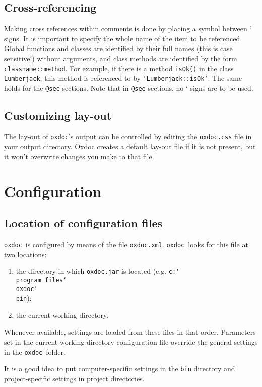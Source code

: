 \documentclass{article}
\newcommand\oxdoc{{\tt oxdoc}}
\newcommand\oxdocxml{{\tt oxdoc.xml}}
\newcommand\bs{{\tt\char`\\}}
\begin{document}
\subsection{Cross-referencing}
Making cross references within comments is done by placing a symbol between ` signs.  It is important to
specify the whole name of the item to be referenced.  Global functions and classes are identified by
their full names (this is case sensitive!) without arguments, and class methods are identified by the
form {\tt classname::method}. For example, if there is a method {\tt isOk()} in the class {\tt Lumberjack},
this method is referenced to by {\tt `Lumberjack::isOk`}.  The same holds for the {\tt @see} sections.
Note that in {\tt @see} sections, no ` signs are to be used.


\subsection{Customizing lay-out}
The lay-out of \oxdoc's output can be controlled by editing the
{\tt oxdoc.css} file in your output directory. Oxdoc creates a default
lay-out file if it is not present, but it won't overwrite changes you make
to that file. 








\section{Configuration}

\subsection{Location of configuration files}
\oxdoc~is configured by means of the file \oxdocxml.
\oxdoc~looks for this file at two locations:
\begin{enumerate}
\item the directory in which {\tt oxdoc.jar}
is located (e.g. {\tt c:\bs program files\bs oxdoc\bs bin});
\item the current working directory.
\end{enumerate}

Whenever available, settings are loaded from these files in that order.
Parameters set in the current working directory configuration file override
the general settings in the \oxdoc~folder.

It is a good idea to put computer-specific settings in the {\tt bin}
directory and project-specific settings in project directories. 
\end{document}
